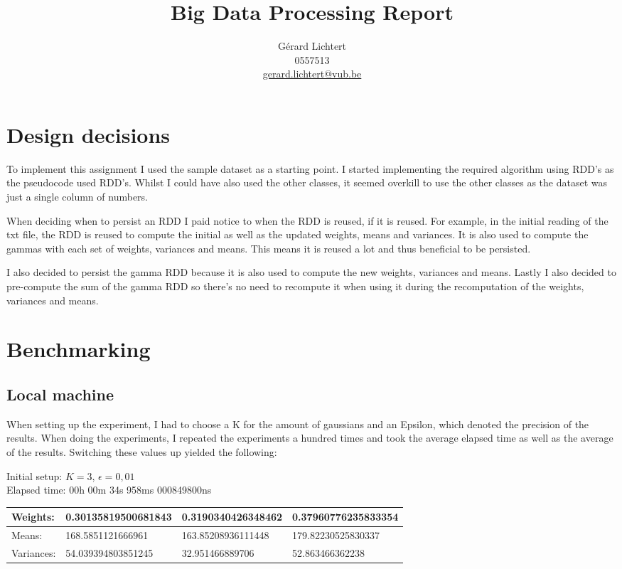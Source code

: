 \documentclass{article}
\title{Big Data Processing Report}
\author{Gérard Lichtert\\
0557513\\
\href{mailto:gerard.lichtert@vub.be}{gerard.lichtert@vub.be}
}
\begin{document}
\maketitle

\tableofcontents
\newpage
\raggedright
\section{Design decisions}
\label{sec:design-decisions}
To implement this assignment I used the sample dataset as a starting point.
I started implementing the required algorithm using RDD's as the pseudocode used RDD's.
Whilst I could have also used the other classes, it seemed overkill to use the other classes as the dataset was just a single column of numbers.
\par
When deciding when to persist an RDD I paid notice to when the RDD is reused, if it is reused.
For example, in the initial reading of the txt file, the RDD is reused to compute the initial as well as the updated weights, means and variances.
It is also used to compute the gammas with each set of weights, variances and means.
This means it is reused a lot and thus beneficial to be persisted.
\par
I also decided to persist the gamma RDD because it is also used to compute the new weights, variances and means.
Lastly I also decided to pre-compute the sum of the gamma RDD so there's no need to recompute it when using it during the recomputation of the weights, variances and means.
\section{Benchmarking}
\subsection{Local machine}
When setting up the experiment, I had to choose a K for the amount of gaussians and an Epsilon, which denoted the precision of the results.
When doing the experiments, I repeated the experiments a hundred times and took the average elapsed time as well as the average of the results.
Switching these values up yielded the following:

Initial setup: $K = 3$, $\epsilon = 0,01$\\
Elapsed time: 00h 00m 34s 958ms 000849800ns\\
\begin{table}[H]
	\begin{tabularx}{\textwidth}{|l|l|l|l|}
		\hline
		Weights:   & 0.30135819500681843 & 0.3190340426348462 & 0.37960776235833354 \\
		\hline
		Means:     & 168.5851121666961   & 163.85208936111448 & 179.82230525830337  \\
		\hline
		Variances: & 54.039394803851245  & 32.951466889706    & 52.863466362238     \\
		\hline
	\end{tabularx}

\end{table}
\end{document}
